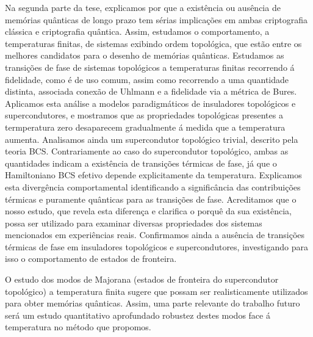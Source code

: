 \documentclass[12pt]{report}
\begin{document}
Na segunda parte da tese, explicamos por que a exist\^{e}ncia ou aus\^{e}ncia de mem\'{o}rias qu\^{a}nticas de longo prazo tem s\'{e}rias implica\c{c}\~{o}es em ambas criptografia cl\'{a}ssica e criptografia qu\^{a}ntica. Assim, estudamos o comportamento, a temperaturas finitas, de sistemas exibindo ordem topol\'{o}gica, que est\~{a}o entre os melhores candidatos para o desenho de mem\'{o}rias qu\^{a}nticas. Estudamos as transi\c{c}\~{o}es de fase de sistemas topol\'{o}gicos a temperaturas finitas recorrendo \'{a} fidelidade, como \'{e} de uso comum, assim como recorrendo a uma quantidade distinta, associada  conex\~{a}o de Uhlmann e a fidelidade via a m\'{e}trica de Bures. Aplicamos esta an\'{a}lise a modelos paradigm\'{a}ticos de insuladores topol\'{o}gicos e supercondutores, e mostramos que as propriedades topol\'{o}gicas presentes a termperatura zero desaparecem gradualmente \'{a} medida que a temperatura aumenta. Analisamos ainda um supercondutor topol\'{o}gico trivial, descrito pela teoria BCS. Contrariamente ao caso do supercondutor topol\'{o}gico, ambas as quantidades indicam a exist\^{e}ncia de transi\c{c}\~{o}es t\'{e}rmicas de fase, j\'{a} que o Hamiltoniano BCS efetivo depende explicitamente da temperatura. Explicamos esta diverg\^{e}ncia comportamental identificando a signific\^{a}ncia das contribui\c{c}\~{o}es t\'{e}rmicas e puramente qu\^{a}nticas para as transi\c{c}\~{o}es de fase. Acreditamos que o nosso estudo, que revela esta diferen\c{c}a e clarifica o porqu\^{e} da sua exist\^{e}ncia, possa ser utilizado para examinar diversas propriedades dos sistemas mencionados em experi\^{e}ncias reais. Confirmamos ainda a aus\^{e}ncia de transi\c{c}\~{o}es t\'{e}rmicas de fase em insuladores topol\'{o}gicos e supercondutores, investigando para isso o comportamento de estados de fronteira.

O estudo dos modos de Majorana (estados de fronteira do supercondutor topol\'{o}gico) a temperatura finita sugere que possam ser realisticamente utilizados para obter mem\'{o}rias qu\^{a}nticas. Assim, uma parte relevante do trabalho futuro ser\'{a} um estudo quantitativo aprofundado robustez destes modos face \'{a} temperatura no m\'{e}todo que propomos.
\end{document}
